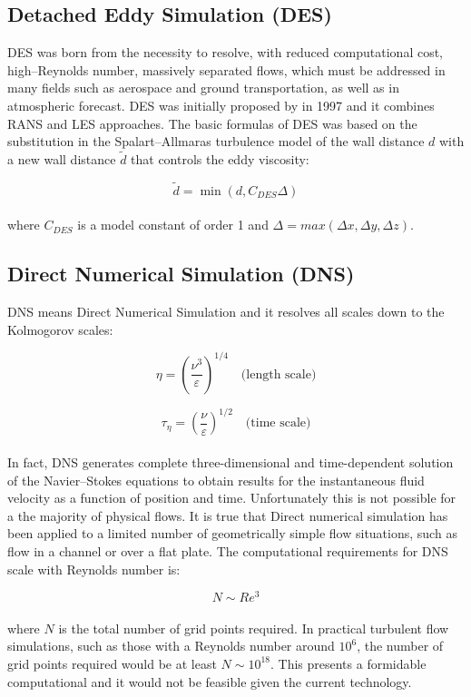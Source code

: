 \documentclass[a5paper]{sapthesis}
\begin{document}
	\subsection{Detached Eddy Simulation (DES)}
	DES was born from the necessity to resolve, with reduced computational cost, high–Reynolds number, massively separated flows, which must be addressed in many fields such as aerospace and ground transportation, as well as in
	atmospheric forecast.
	DES was initially proposed by \citet{DES} in 1997 and it combines RANS and LES approaches. The basic formulas of DES was based on the substitution in the Spalart–Allmaras turbulence model of the wall distance $d$ with a new wall distance $\tilde{d}$ that controls the eddy viscosity:
	
	\begin{equation}
		\tilde{d} = \min(d, C_{DES}\Delta)
	\end{equation}
	\\
	where $C_{DES}$ is a model constant of order 1 and $\Delta = max(\Delta x, \Delta y, \Delta z)$.
	
	\subsection{Direct Numerical Simulation (DNS)}
	DNS means Direct Numerical Simulation and it resolves all scales down to the Kolmogorov scales:
	
	\begin{equation}
		\eta = \left(\frac{\nu^3}{\varepsilon}\right)^{1/4} \quad \text{(length scale)}
	\end{equation}
	
	\begin{equation}
		\tau_\eta = \left(\frac{\nu}{\varepsilon}\right)^{1/2} \quad \text{(time scale)}
	\end{equation}
	\\
	In fact, DNS generates complete three-dimensional and time-dependent solution of the Navier–Stokes equations to obtain results for the instantaneous fluid velocity as a function of position and time. Unfortunately this is not possible for a the majority of physical flows. It is true that Direct numerical simulation has been applied to a limited number of geometrically simple flow situations, such as flow in a channel or over a flat plate. 
	The computational requirements for DNS scale with Reynolds number is:
	
	\begin{equation}
		N \sim Re^3
	\end{equation}
	\\
	where $N$ is the total number of grid points required. In practical turbulent flow simulations, such as those with a Reynolds number around $10^6$, the number of grid points required would be at least $N\sim 10^{18}$. This presents a formidable computational and it would not be feasible given the current technology.
		
\end{document}
